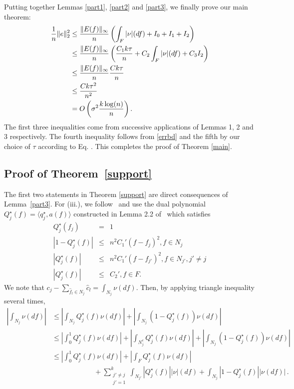 Putting together Lemmas \ref{part1}, \ref{part2} and \ref{part3}, we finally prove our main theorem:
\begin{align*}
\frac{1}{n}\lVert e\rVert_2^2 
&\leq \frac{\lVert E(f)\rVert_\infty}{n} \left(\int_F{|\nu|(df)} + I_0 + I_1 + I_2\right)\\
&\leq \frac{\lVert E(f)\rVert_\infty}{n} \left(\frac{C_1 k \tau}{n} + C_2 \int_F{|\nu|(df)} + C_3 I_2\right)\\
&\leq  \frac{\lVert E(f)\rVert_\infty}{n} \frac{C k \tau}{n} \\
& \leq \frac{C k \tau^2}{n^2}\\
&= O\left(\sigma^2\frac{k \log(n)}{n}\right).
\end{align*}
The first three inequalities come from successive applications of Lemmas 1, 2 and 3 respectively. The fourth inequality follows from \eqref{errbd} and the fifth by our choice of $\tau$ according to Eq. . This completes the proof of Theorem \ref{main}.



\subsection{Proof of Theorem~\ref{support}}
\label{sec:support}
The first two statements in Theorem \ref{support} are direct consequences of Lemma~\ref{part3}. For (iii.), we follow~\cite{granda2} and  use the dual polynomial $Q_j^{\star} ( f) = \langle q_j^{\star}, a ( f)\rangle$ constructed in Lemma 2.2 of~\cite{granda2} which satisfies
\begin{eqnarray*}
  Q_j^{\star} ( f_j) & = & 1\\
  | 1 - Q_j^{\star} ( f) | & \leq & n^2 C_1' ( f - f_j)^2, f \in N_j\\
  | Q_j^{\star} ( f) | & \leq & n^2 C_1' ( f - f_{j'})^2, f \in N_{j'}, j' \neq
  j\\
  | Q_j^{\star} ( f) | & \leq & C_2', f \in F.
\end{eqnarray*}
We note that $c_j - \sum_{\hat{f}_l \in N_j} \hat{c}_l = \int_{N_j} \nu(df)$. Then, by applying triangle inequality several times,
\begin{align*}
\left| \int_{N_j}  \nu(df)\right|
& \leq \left| \int_{N_j}  Q_j^\star (f) \nu(df)\right| + \left| \int_{N_j}  (1-Q_j^\star (f)) \nu(df)\right|\\
& \leq \left| \int_0^1  Q_j^\star (f) \nu(df)\right| + \left| \int_{N_j^c}  Q_j^\star (f) \nu(df)\right| + \left| \int_{N_j}  (1-Q_j^\star (f)) \nu(df)\right|\\
& \leq \left|\int_0^1  Q_j^\star (f) \nu(df)\right| + \left| \int_{F}  Q_j^\star (f) \nu(df)\right| \\
&\qquad\qquad\qquad + \sum_{\substack{j' \neq j\\j'=1}}^k \int_{N_{j'}} \left| Q_j^\star (f)\right| |\nu|(df) +  \int_{N_j}  \left|1-Q_j^\star (f)\right| |\nu(df)|\,.
\end{align*}

